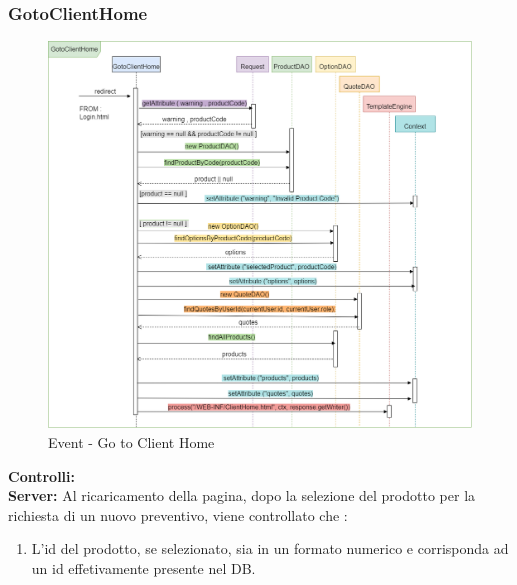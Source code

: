 \documentclass[a4paper, 12pt]{article}
\begin{document}
\subsubsection{GotoClientHome}
\begin{figure}[h!]
	\centering
	\includegraphics[width=1\textwidth]{PureHTML_images/GotoClientHome.png}
	\caption{Event - Go to Client Home}
	\label{figure:gotoclienthome_sd}
\end{figure}
\noindent \textbf{Controlli:}\\
\noindent \textbf{Server:} 
\noindent Al ricaricamento della pagina, dopo la selezione del prodotto per la richiesta di un nuovo preventivo, viene controllato che :
\begin{enumerate}
\item L'id del prodotto, se selezionato, sia in un formato numerico e corrisponda ad un id effetivamente presente nel DB.
\end{enumerate}
\newpage
\end{document}
